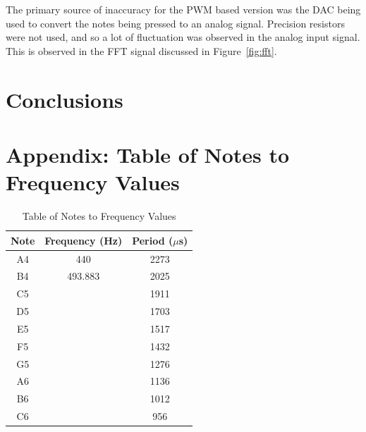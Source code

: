 \documentclass[12pt]{article}
\begin{document}
The primary source of inaccuracy for the PWM based version was the DAC being used to convert the notes being pressed to an analog signal.
Precision resistors were not used, and so a lot of fluctuation was observed in the analog input signal.
This is observed in the FFT signal discussed in Figure~\ref{fig:fft}.

\section{Conclusions}\label{sec:conclusions}





\break

\appendix

\section{Appendix: Table of Notes to Frequency Values}\label{sec:-table-of-notes-to-frequency-values}




\begin{table}[H]
    \centering
    \begin{tabular}{|c|c|c|}
    \hline
    Note & Frequency (Hz) & Period ($\mu$s) \\
    \hline
        A4 & 440 & 2273 \\
        B4 & 493.883 & 2025 \\
        C5 &  & 1911 \\
        D5 &  & 1703 \\
        E5 &  & 1517 \\
        F5 &  & 1432 \\
        G5 &  & 1276 \\
        A6 &  & 1136 \\
        B6 &  & 1012 \\
        C6 &  & 956 \\
        \hline
    \end{tabular}
    \caption{Table of Notes to Frequency Values}
    \label{tab:pianonotestofrequency}
\end{table}
\end{document}
